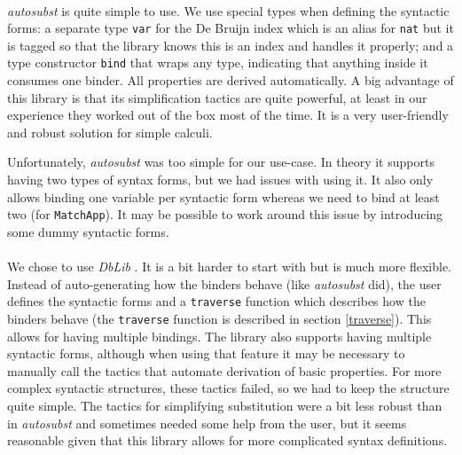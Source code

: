 \documentclass[runningheads]{article}
\begin{document}
\paragraph{}

\textit{autosubst} \cite{autosubst} is quite simple to use. We use special types when defining the syntactic forms: a separate type \verb|var| for the De Bruijn index which is an alias for \verb|nat| but it is tagged so that the library knows this is an index and handles it properly; and a type constructor \verb|bind| that wraps any type, indicating that anything inside it consumes one binder. All properties are derived automatically. A big advantage of this library is that its simplification tactics are quite powerful, at least in our experience they worked out of the box most of the time. It is a very user-friendly and robust solution for simple calculi.

Unfortunately, \textit{autosubst} was too simple for our use-case. In theory it supports having two types of syntax forms, but we had issues with using it. It also only allows binding one variable per syntactic form whereas we need to bind at least two (for \verb|MatchApp|). It may be possible to work around this issue by introducing some dummy syntactic forms.


\paragraph{}

We chose to use \textit{DbLib} \cite{dblib}. It is a bit harder to start with but is much more flexible. Instead of auto-generating how the binders behave (like \textit{autosubst} did), the user defines the syntactic forms and a \verb|traverse| function which describes how the binders behave (the \verb|traverse| function is described in section \ref{traverse}). This allows for having multiple bindings. The library also supports having multiple syntactic forms, although when using that feature it may be necessary to manually call the tactics that automate derivation of basic properties. For more complex syntactic structures, these tactics failed, so we had to keep the structure quite simple. The tactics for simplifying substitution were a bit less robust than in \textit{autosubst} and sometimes needed some help from the user, but it seems reasonable given that this library allows for more complicated syntax definitions.
\end{document}
